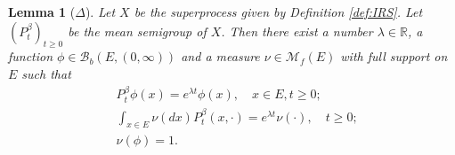 \documentclass[12pt,a4paper]{amsart}
\numberwithin{equation}{section}
\theoremstyle{plain}
\newtheorem{lem}[thm]{Lemma}
\theoremstyle{definition}
\begin{document}
\begin{comment}
  \begin{lem}[Fact]
    \label{lem:E}
    Let $X$ be the superprocess given in Definition \ref{def:IRS}. 
    Define a function $\psi_0$ on $E\times [0,\infty)$ such that $ \psi_0(x,z)  := \psi(x,z)+ \beta(x) z$ for each  $x\in E$ and  $z \geq 0$.
    Using the monotonicity, extend $\psi$ as a $[0,\infty]$-valued function on $E \times [0,\infty]$ by setting that $\psi(x,\infty) = \lim_{z\uparrow \infty} \psi(x,z)$.
    Define operator $\Psi_0$ on $\mathcal B(E,[0,\infty])$ by $ \Psi_0 g(x):=\psi_0(x, g(x))$.
    Then we have
    \begin{align}
      V_sf+ \int_0^s P_{s-u}^\beta \Psi_0V_u f du = P_s^\beta f,
      \quad s\geq 0, f\in \mathcal B(E, [0,\infty]).
    \end{align}
  \end{lem}
\end{comment}

  \begin{lem}[$\Delta$]
    \label{lem:PSS}
    Let $X$ be the superprocess given by Definition \ref{def:IRS}. 
    Let $(P^\beta_t)_{t\geq 0}$ be the mean semigroup of $X$.
    Then there exist a number $\lambda \in \mathbb R$, a function $\phi \in \mathcal B_b(E, (0,\infty))$ and a measure $\nu \in \mathcal M_f(E)$ with full support on $E$ such that
    \begin{align}
      & P_t^\beta \phi(x) 
        = e^{\lambda t} \phi(x),
        \quad x\in E, t\geq 0;
      \\ & \int_{x\in E} \nu(dx) P_t^\beta(x,\cdot) 
           = e^{\lambda t} \nu(\cdot),
           \quad t\geq 0;
      \\ & \nu(\phi) 
           = 1.   
    \end{align}
  \end{lem}
  
\end{document}
